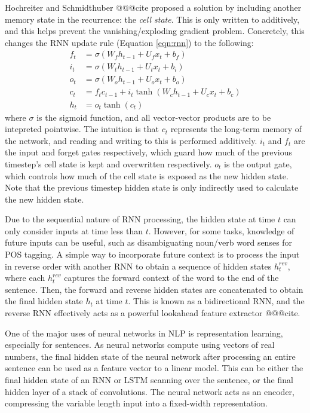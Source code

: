Hochreiter and Schmidthuber @@@cite proposed a solution by including another memory state in the recurrence: the \textit{cell state}. This is only written to additively, and this helps prevent the vanishing/exploding gradient problem. Concretely, this changes the RNN update rule (Equation \ref{eqn:rnn}) to the following:
\begin{align}
    f_t &= \sigma(W_f h_{t-1} + U_f x_t + b_f) \\
    i_t &= \sigma(W_t h_{t-1} + U_t x_t + b_i) \\
    o_t &= \sigma(W_o h_{t-1} + U_o x_t + b_o) \\
    c_t &= f_t c_{t-1} + i_t \tanh(W_c h_{t-1} + U_c x_t + b_c) \\
    h_t &= o_t \tanh(c_t)
\end{align}
where $\sigma$ is the sigmoid function, and all vector-vector products are to be intepreted pointwise. The intuition is that $c_t$ represents the long-term memory of the network, and reading and writing to this is performed additively. $i_t$ and $f_t$ are the input and forget gates respectively, which guard how much of the previous timestep's cell state is kept and overwritten respectively. $o_t$ is the output gate, which controls how much of the cell state is exposed as the new hidden state. Note that the previous timestep hidden state is only indirectly used to calculate the new hidden state.

Due to the sequential nature of RNN processing, the hidden state at time $t$ can only consider inputs at time less than $t$. However, for some tasks, knowledge of future inputs can be useful, such as disambiguating noun/verb word senses for POS tagging. A simple way to incorporate future context is to process the input in reverse order with another RNN to obtain a sequence of hidden states $h_t^{rev}$, where each $h_t^{rev}$ captures the forward context of the word to the end of the sentence. Then, the forward and reverse hidden states are concatenated to obtain the final hidden state $h_t$ at time $t$. This is known as a bidirectional RNN, and the reverse RNN effectively acts as a powerful lookahead feature extractor @@@cite.

One of the major uses of neural networks in NLP is representation learning, especially for sentences. As neural networks compute using vectors of real numbers, the final hidden state of the neural network after processing an entire sentence can be used as a feature vector to a linear model. This can be either the final hidden state of an RNN or LSTM scanning over the sentence, or the final hidden layer of a stack of convolutions. The neural network acts as an encoder, compressing the variable length input into a fixed-width representation. 


